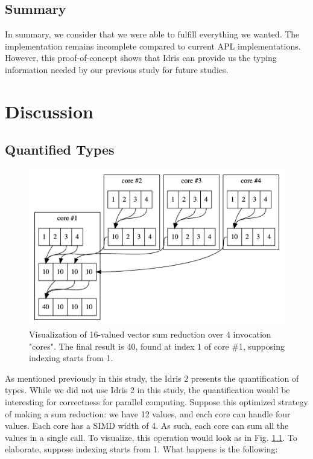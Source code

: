 \documentclass{report}
\begin{document}
\section*{Summary}

In summary, we consider that we were able to fulfill everything we wanted. The implementation remains incomplete compared to current APL implementations. However, this proof-of-concept shows that Idris can provide us the typing information needed by our previous study for future studies.

\chapter{Discussion}
\label{ch:discussion}

\section{Quantified Types}

\begin{figure}
  \centering
  \includegraphics[scale=0.25]{freduc.png}
  \caption{Visualization of 16-valued vector sum reduction over 4 invocation "cores". The final result is 40, found at index 1 of core \#1, supposing indexing starts from 1.}
  \label{fig:freduc}
\end{figure}

As mentioned previously in this study, the Idris 2 presents the quantification of types. While we did not use Idris 2 in this study, the quantification would be interesting for correctness for parallel computing. Suppose this optimized strategy of making a sum reduction: we have 12 values, and each core can handle four values. Each core has a SIMD width of 4. As such, each core can sum all the values in a single call. To visualize, this operation would look as in Fig. \ref{fig:freduc}. To elaborate, suppose indexing starts from 1. What happens is the following:
\end{document}
